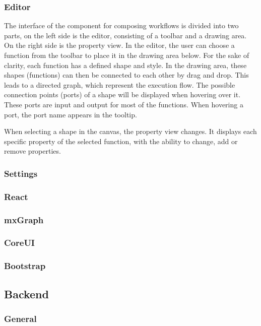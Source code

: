 \documentclass[a4paper,11pt,pdftex,halfparskip,cleardoubleempty]{scrbook}
\begin{document}
\subsubsection{Editor}
\par
The interface of the component for composing workflows is divided into two parts, on the left side is the editor, consisting of a toolbar and a drawing area. On the right side is the property view. In the editor, the user can choose a function from the toolbar to place it in the drawing area below.  For the sake of clarity, each function has a defined shape and style. In the drawing area, these shapes (functions) can then be connected to each other by drag and drop. This leads to a directed graph, which represent the execution flow. The possible connection points (ports) of a shape will be displayed when hovering over it. These ports are input and output for most of the functions. When hovering a port, the port name appears in the tooltip.
\par
When selecting a shape in the canvas, the property view changes. It displays each specific property of the selected function, with the ability to change, add or remove properties.


\subsubsection{Settings}


\subsubsection{React}
\subsubsection{mxGraph}
\subsubsection{CoreUI}
\subsubsection{Bootstrap}


\subsection{Backend}
\subsubsection{General}
\end{document}
